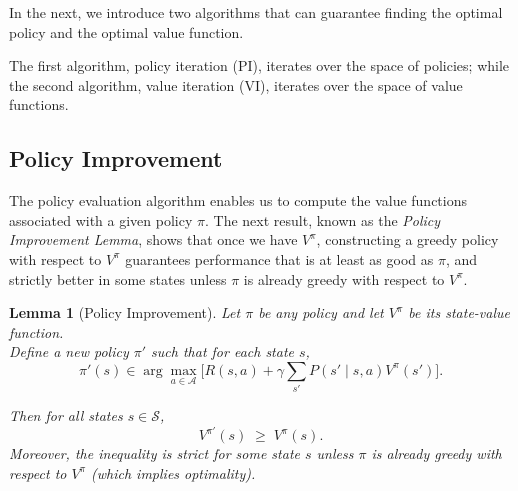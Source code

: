 \documentclass[
]{book}
\newtheorem{lemma}{Lemma}[chapter]
\theoremstyle{definition}
\theoremstyle{definition}
\theoremstyle{definition}
\theoremstyle{definition}
\theoremstyle{remark}
\begin{document}
In the next, we introduce two algorithms that can guarantee finding the optimal policy and the optimal value function.

The first algorithm, policy iteration (PI), iterates over the space of policies; while the second algorithm, value iteration (VI), iterates over the space of value functions.

\subsection{Policy Improvement}\label{policy-improvement}

The policy evaluation algorithm enables us to compute the value functions associated with a given policy \(\pi\). The next result, known as the \emph{Policy Improvement Lemma}, shows that once we have \(V^{\pi}\), constructing a greedy policy with respect to \(V^{\pi}\) guarantees performance that is at least as good as \(\pi\), and strictly better in some states unless \(\pi\) is already greedy with respect to \(V^{\pi}\).

\begin{lemma}[Policy Improvement]
\protect\hypertarget{lem:InfiniteHorizonPolicyImprovement}{}\label{lem:InfiniteHorizonPolicyImprovement}Let \(\pi\) be any policy and let \(V^{\pi}\) be its state-value function.\\
Define a new policy \(\pi'\) such that for each state \(s\),
\[
\pi'(s) \in \arg\max_{a \in \mathcal{A}}
\Big[ R(s,a) + \gamma \sum_{s'} P(s' \mid s,a) V^{\pi}(s') \Big].
\]

Then for all states \(s \in \mathcal{S}\),
\[
V^{\pi'}(s) \;\ge\; V^{\pi}(s).
\]
Moreover, the inequality is strict for some state \(s\) unless \(\pi\) is already greedy with respect to \(V^\pi\) (which implies optimality).
\end{lemma}
\end{document}
